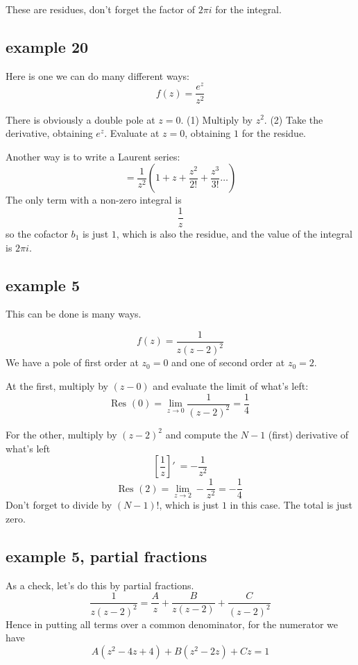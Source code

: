 \documentclass[11pt, oneside]{article}
\begin{document}
These are residues, don't forget the factor of $2 \pi i$ for the integral.

\subsection*{example 20}

\label{sec:ex20R}

Here is one we can do many different ways:
\[ f(z) = \frac{e^z}{z^2} \]

There is obviously a double pole at $z = 0$.  (1) Multiply by $z^2$.  (2) Take the derivative, obtaining $e^z$.  Evaluate at $z = 0$, obtaining $1$ for the residue.

\label{sec:ex20L}

Another way is to write a Laurent series:
\[ = \frac{1}{z^2} (1 + z + \frac{z^2}{2!} + \frac{z^3}{3!} \dots ) \]
The only term with a non-zero integral is\
\[ \frac{1}{z} \]
so the cofactor $b_1$ is just $1$, which is also the residue, and the value of the integral is $2 \pi i$.

\subsection*{example 5}

This can be done is many ways.

\label{sec:ex5R}

\[ f(z) = \frac{1}{z(z-2)^2} \]
We have a pole of first order at $z_0=0$ and one of second order at $z_0=2$.  

At the first, multiply by $(z - 0)$ and evaluate the limit of what's left:
\[ \text{Res }(0) = \lim_{z \rightarrow 0} \frac{1}{(z-2)^2} = \frac{1}{4} \]

For the other, multiply by $(z-2)^2$ and compute the $N-1$ (first) derivative of what's left
\[ [ \frac{1}{z} ]' \ =  - \frac{1}{z^2} \]
\[ \text{Res } (2) = \lim_{z \rightarrow 2} -\frac{1}{z^2} = -\frac{1}{4} \]
Don't forget to divide by $(N-1)!$, which is just $1$ in this case.  The total is just zero.

\subsection*{example 5, partial fractions}

\label{sec:ex5PF}

As a check, let's do this by partial fractions.
\[ \frac{1}{z(z-2)^2} = \frac{A}{z} +  \frac{B}{z(z-2)} +  \frac{C}{(z-2)^2}  \]
Hence in putting all terms over a common denominator, for the numerator we have
\[ A(z^2 - 4z + 4) + B(z^2 - 2z) + Cz = 1 \]
\end{document}
